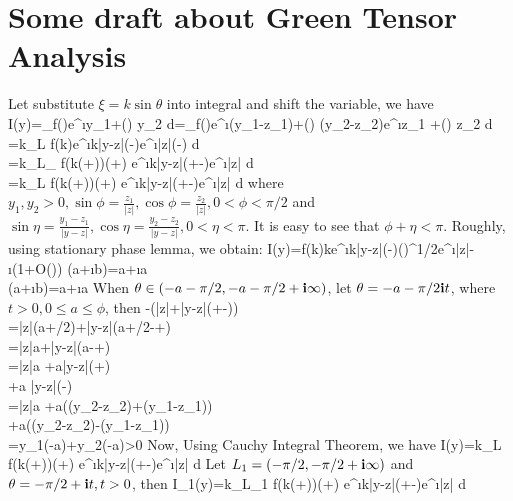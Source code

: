 \documentclass[12pt]{iopart}
\begin{document}
	\section{Some draft about Green Tensor Analysis}
	Let substitute $\xi=k\sin\theta$ into integral and shift the variable, we have
	\be
	I(y)=\int_\R f(\xi)e^{\i \xi y_1+\mu(\xi) y_2} d\xi =\int_\R f(\xi)e^{\i \xi (y_1-z_1)+\mu(\xi) (y_2-z_2)}e^{\i \xi z_1 +\mu(\xi) z_2} d\xi \\
	=k\int_{L} f(k\sin\theta)\cos\theta e^{\i k|y-z|\cos(\theta-\eta)}e^{\i|z|\cos(\theta-\phi)} d\theta\\
	=k\int_{L_\phi} f(k\sin(\theta+\phi))\cos(\theta+\phi) e^{\i k|y-z|\cos(\theta+\phi-\eta)}e^{\i|z|\cos\theta} d\theta\\
	=k\int_{L} f(k\sin(\theta+\phi))\cos(\theta+\phi) e^{\i k|y-z|\cos(\theta+\phi-\eta)}e^{\i|z|\cos\theta} d\theta
	\ee
	where $y_1,y_2>0,\sin\phi=\frac{z_1}{|z|},\cos\phi=\frac{z_2}{|z|},0<\phi<\pi/2$ and $\sin\eta=\frac{y_1-z_1}{|y-z|},\cos\eta=\frac{y_2-z_2}{|y-z|},0<\eta<\pi$. It is easy to see that $\phi+\eta<\pi$. Roughly, using stationary phase lemma, we obtain:
	\be
	I(y)=f(k\sin\phi)k\cos\phi e^{\i k|y-z|\cos(\phi-\eta)}()^{1/2}e^{\i|z|-\i{}}(1+O())
	\ee
	\be
	\cos(a+\i b)=\cos a+\i{}\sin a \\
	\sin(a+\i b)=\sin a+\i{}\cos a
	\ee
	When $\theta\in(-a-\pi/2,-a-\pi/2+\mathbf{i}\infty)$, let $\theta=-a-\pi/2\mathbf{i} t$, where $t>0,0\leq
	a\leq\phi$, then
	\be\nn
	-\Im(|z|\cos\theta+|y-z|\cos(\theta+\phi-\eta))\\
	=|z|\sin(a+\pi/2)+|y-z|\sin(a+\pi/2-\phi+\eta) \\
	=|z|\cos a+|y-z|\cos(a-\phi+\eta) \\
	=|z|\cos a +\cos a|y-z|(\cos\phi\cos\eta+\sin\phi\sin\eta)\\
	+\sin a |y-z|(\sin\phi\cos\eta-\cos\phi\sin\eta)\\
	=|z|\cos a +\cos a((y_2-z_2)\cos\phi+(y_1-z_1)\sin\phi)\\
	+\sin a((y_2-z_2)\sin\phi-(y_1-z_1)\cos\phi) \\
	=y_1\sin(\phi-a)+y_2\cos(\phi-a)>0
	\ee
	Now, Using Cauchy Integral Theorem, we have
	\be
	I(y)=k\int_{L} f(k\sin(\theta+\phi))\cos(\theta+\phi) e^{\i k|y-z|\cos(\theta+\phi-\eta)}e^{\i|z|\cos\theta} d\theta
	\ee
	Let $L_1=(-\pi/2,-\pi/2+\mathbf{i}\infty)$ and $\theta=-\pi/2+\mathbf{i} t,t>0$, then
	\be
	I_1(y)=k\int_{L_1} f(k\sin(\theta+\phi))\cos(\theta+\phi) e^{\i k|y-z|\cos(\theta+\phi-\eta)}e^{\i|z|\cos\theta} d\theta \\
\end{document}

